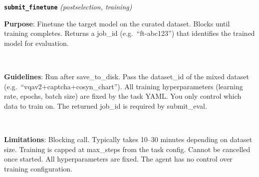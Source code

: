 \medskip
\noindent\textbf{\texttt{submit\_finetune}} \textit{(postselection, training)}
\begin{tcolorbox}[enhanced, colback=white, colframe=black!60, boxrule=0.6pt, left=6pt, right=6pt, top=0pt, bottom=0pt, sharp corners, boxsep=0pt]
\colorbox{purposebg}{\parbox{\dimexpr\linewidth-2\fboxsep}{%
\ttfamily\scriptsize\vspace{4pt}
\textbf{Purpose}: Finetune the target model on the curated dataset. Blocks until training completes. Returns a job\_id (e.g.\ ``ft-abc123'') that identifies the trained model for evaluation.\vspace{4pt}
}}\\[-1pt]
\colorbox{guidelinesbg}{\parbox{\dimexpr\linewidth-2\fboxsep}{%
\ttfamily\scriptsize\vspace{4pt}
\textbf{Guidelines}: Run after save\_to\_disk. Pass the dataset\_id of the mixed dataset (e.g.\ ``vqav2+captcha+cosyn\_chart''). All training hyperparameters (learning rate, epochs, batch size) are fixed by the task YAML. You only control which data to train on. The returned job\_id is required by submit\_eval.\vspace{4pt}
}}\\[-1pt]
\colorbox{limitationsbg}{\parbox{\dimexpr\linewidth-2\fboxsep}{%
\ttfamily\scriptsize\vspace{4pt}
\textbf{Limitations}: Blocking call. Typically takes 10--30 minutes depending on dataset size. Training is capped at max\_steps from the task config. Cannot be cancelled once started. All hyperparameters are fixed. The agent has no control over training configuration.\vspace{4pt}
}}
\end{tcolorbox}


